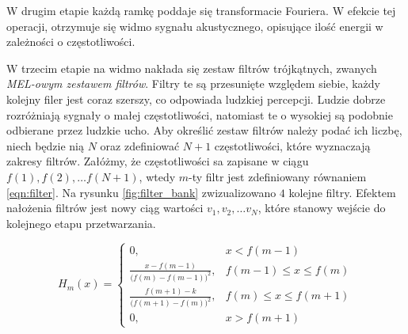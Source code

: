 \documentclass[shortabstract, mgr]{iithesis}
\begin{document}
	 W drugim etapie każdą ramkę poddaje się transformacie Fouriera. W efekcie tej operacji, otrzymuje się widmo sygnału akustycznego, opisujące ilość energii w zależności o częstotliwości.
	 
	 W trzecim etapie na widmo nakłada się zestaw filtrów trójkątnych, zwanych \textit{MEL-owym zestawem filtrów}. Filtry te są przesunięte względem siebie, każdy kolejny filer jest coraz szerszy, co odpowiada ludzkiej percepcji. Ludzie dobrze rozróżniają sygnały o małej częstotliwości, natomiast te o wysokiej są podobnie odbierane przez ludzkie ucho. Aby określić zestaw filtrów należy podać ich liczbę, niech będzie nią $N$ oraz zdefiniować $N+1$ częstotliwości, które wyznaczają zakresy filtrów. Załóżmy, że częstotliwości sa zapisane w ciągu $f(1), f(2), \ldots f(N+1)$, wtedy $m$-ty filtr jest zdefiniowany równaniem \ref{eqn:filter}. Na rysunku \ref{fig:filter_bank} zwizualizowano $4$ kolejne filtry. Efektem nałożenia filtrów jest nowy ciąg wartości $v_1, v_2, \ldots v_N$, które stanowy wejście do kolejnego etapu przetwarzania.
	 
	 \begin{equation}
		 H_m(x)= 
			 \begin{cases}
				 0,				 					 & x < f(m-1) 		       \\
				 \frac{x - f(m-1)}{\big(f(m) - f(m-1)\big)^2}, & f(m-1) \leq x \leq f(m) \\
				 \frac{f(m+1) - k}{\big(f(m+1) - f(m)\big)^2}, & f(m) \leq x \leq f(m+1) \\
				 0,				 					 & x > f(m+1)
			 \end{cases}
		 \label{eqn:filter}
	 \end{equation}
	 
\end{document}
